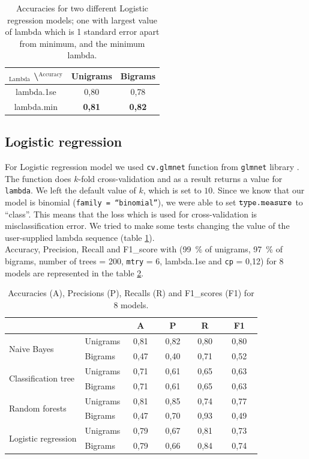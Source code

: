 \documentclass[a4paper,11pt]{article}
\begin{document}
\begin{table}[h!]
\centering
\begin{tabular}{c || c | c}
$_{\text{Lambda}}$ \textbackslash $^{\text{Accuracy}}$ & Unigrams & Bigrams \\ \hline \hline
lambda.1se & 0{,}80 & 0{,}78 \\ \hline
lambda.min & \textbf{0{,}81} & \textbf{0{,}82} 
\end{tabular}
\caption{Accuracies for two different Logistic regression models; one with largest value of lambda which is 1 standard error apart from minimum, and the minimum lambda.}
\label{tab: logisticRegression}
\end{table}

\subsection{Logistic regression}

For Logistic regression model we used \verb|cv.glmnet| function from \verb|glmnet| library \cite{glmnet}. The function does $k$-fold cross-validation and as a result returns a value for \verb|lambda|. We left the default value of $k$, which is set to $10$. Since we know that our model is binomial (\verb|family = “binomial”|), we were able to set $\verb|type.measure|$ to “class”. This means that the loss which is used for cross-validation is misclassification error. We tried to make some tests changing the value of the user-supplied lambda sequence (table \ref{tab: logisticRegression}). \\

Accuracy, Precision, Recall and F1\_score with (99~\% of unigrams, 97~\% of bigrams, number of trees = 200, \verb|mtry| = 6, lambda.1se and \verb|cp| = 0{,}12) for 8 models are represented in the table \ref{tab: results}.

\begin{table}[h!]
\centering
\begin{tabular}{l | l || c | c | c | c} 
\multicolumn{2}{c|}{} & $\quad$A$\quad$ & $\quad$P$\quad$ & $\quad$R$\quad$ & $\quad$F1$\quad$ \\ \hline \hline
\multirow{2}{*}{Naive Bayes} & Unigrams & 0{,}81 & 0{,}82 & 0{,}80 & 0{,}80 \\ \cline{2-6}
& Bigrams & 0{,}47 & 0{,}40 & 0{,}71 & 0{,}52 \\ \hline
\multirow{2}{*}{Classification tree} & Unigrams & 0{,}71 & 0{,}61 & 0{,}65 & 0{,}63 \\ \cline{2-6}
& Bigrams & 0{,}71 & 0{,}61 & 0{,}65 & 0{,}63 \\ \hline
\multirow{2}{*}{Random forests} & Unigrams & 0{,}81 & 0{,}85 & 0{,}74 & 0{,}77 \\ \cline{2-6}
& Bigrams & 0{,}47 & 0{,}70 & 0{,}93 & 0{,}49 \\ \hline
\multirow{2}{*}{Logistic regression} & Unigrams & 0{,}79 & 0{,}67 & 0{,}81 & 0{,}73 \\ \cline{2-6}
& Bigrams & 0{,}79 & 0{,}66 & 0{,}84 & 0{,}74
\end{tabular}
\caption{Accuracies (A), Precisions (P), Recalls (R) and F1\_scores (F1) for 8 models.}
\label{tab: results}
\end{table}
\end{document}
